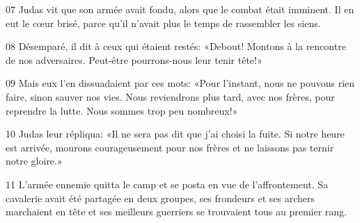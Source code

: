 
07 Judas vit que son armée avait fondu, alors que le combat était imminent. Il en eut le cœur brisé, parce qu’il n’avait plus le temps de rassembler les siens.

08 Désemparé, il dit à ceux qui étaient restés: «Debout! Montons à la rencontre de nos adversaires. Peut-être pourrons-nous leur tenir tête!»

09 Mais eux l’en dissuadaient par ces mots: «Pour l’instant, nous ne pouvons rien faire, sinon sauver nos vies. Nous reviendrons plus tard, avec nos frères, pour reprendre la lutte. Nous sommes trop peu nombreux!»

10 Judas leur répliqua: «Il ne sera pas dit que j’ai choisi la fuite. Si notre heure est arrivée, mourons courageusement pour nos frères et ne laissons pas ternir notre gloire.»

11 L’armée ennemie quitta le camp et se posta en vue de l’affrontement. Sa cavalerie avait été partagée en deux groupes, ses frondeurs et ses archers marchaient en tête et ses meilleurs guerriers se trouvaient tous au premier rang.
